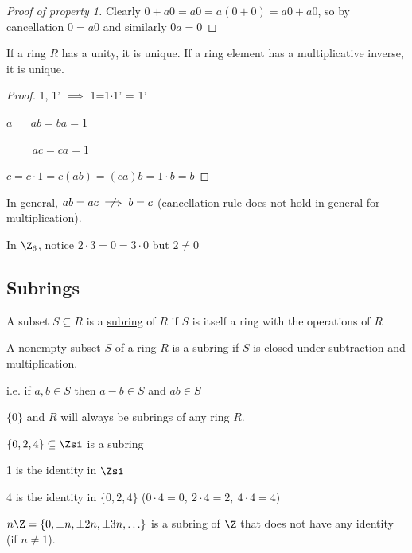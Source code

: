 \begin{proof}[Proof of property 1]
    Clearly \(0+a0 = a0 = a(0+0) = a0 + a0\), so by cancellation \(0=a0\) and similarly \(0a=0\)
\end{proof}

\begin{theorem}
  If a ring \(R\) has a unity, it is unique. If a ring element has a multiplicative inverse, it is unique.
\end{theorem}

\begin{proof}
1, 1' \(\implies\) 1=1\(\cdot\)1' = 1'

\(a\) \(\quad\) \(ab=ba = 1\)

\(\qquad\) \(ac=ca=1\)

\(c = c\cdot 1 = c(ab) = (ca)b = 1\cdot b = b\)
\end{proof}

\begin{warning}
In general, \(ab = ac \centernot\implies b=c\) (cancellation rule does not hold in general for multiplication).
\end{warning}

\begin{example}
  In \(\Z_6\), notice \(2\cdot 3 = 0 = 3\cdot 0\) but \(2\neq 0\)
\end{example}

\subsection{Subrings}

\begin{definition}[Subring]
  A subset \(S\subseteq R\) is a \ul{subring} of \(R\) if \(S\) is itself a ring with the operations of \(R\)
\end{definition}

\begin{theorem}
  A nonempty subset \(S\) of a ring \(R\) is a subring if \(S\)  is closed under subtraction and multiplication.

  i.e. if \(a,b\in S\) then \(a-b\in S\) and \(ab \in S\)
\end{theorem}

\begin{example}
  \(\{0\}\) and \(R\) will always be subrings of any ring \(R\).
\end{example}

\begin{example}
  \(\{0,2,4\}\subseteq \Zsi\) is a subring

  1 is the identity in \(\Zsi\)

  4 is the identity in \(\{0,2,4\}\) (\(0\cdot 4 = 0,\ 2\cdot 4 = 2,\ 4\cdot 4 = 4\))
\end{example}

\begin{example}
  \(n\Z = \{0, \pm n, \pm 2n, \pm 3n,\ldots\}\) is a subring of \(\Z\) that does not have any identity (if \(n\neq 1\)).
\end{example}